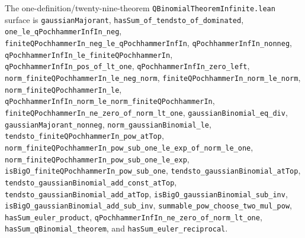 \documentclass[11pt,oneside]{article}
\theoremstyle{definition}
\theoremstyle{remark}
\begin{document}
The one-definition/twenty-nine-theorem
\nolinkurl{QBinomialTheoremInfinite.lean} surface is
\nolinkurl{gaussianMajorant},
\nolinkurl{hasSum_of_tendsto_of_dominated},
\nolinkurl{one_le_qPochhammerInfIn_neg},
\nolinkurl{finiteQPochhammerIn_neg_le_qPochhammerInfIn},
\nolinkurl{qPochhammerInfIn_nonneg},
\nolinkurl{qPochhammerInfIn_le_finiteQPochhammerIn},
\nolinkurl{qPochhammerInfIn_pos_of_lt_one},
\nolinkurl{qPochhammerInfIn_zero_left},
\nolinkurl{norm_finiteQPochhammerIn_le_neg_norm},
\nolinkurl{finiteQPochhammerIn_norm_le_norm},
\nolinkurl{norm_finiteQPochhammerIn_le},
\nolinkurl{qPochhammerInfIn_norm_le_norm_finiteQPochhammerIn},
\nolinkurl{finiteQPochhammerIn_ne_zero_of_norm_lt_one},
\nolinkurl{gaussianBinomial_eq_div},
\nolinkurl{gaussianMajorant_nonneg},
\nolinkurl{norm_gaussianBinomial_le},
\nolinkurl{tendsto_finiteQPochhammerIn_pow_atTop},
\nolinkurl{norm_finiteQPochhammerIn_pow_sub_one_le_exp_of_norm_le_one},
\nolinkurl{norm_finiteQPochhammerIn_pow_sub_one_le_exp},
\nolinkurl{isBigO_finiteQPochhammerIn_pow_sub_one},
\nolinkurl{tendsto_gaussianBinomial_atTop},
\nolinkurl{tendsto_gaussianBinomial_add_const_atTop},
\nolinkurl{tendsto_gaussianBinomial_add_atTop},
\nolinkurl{isBigO_gaussianBinomial_sub_inv},
\nolinkurl{isBigO_gaussianBinomial_add_sub_inv},
\nolinkurl{summable_pow_choose_two_mul_pow},
\nolinkurl{hasSum_euler_product},
\nolinkurl{qPochhammerInfIn_ne_zero_of_norm_lt_one},
\nolinkurl{hasSum_qBinomial_theorem}, and
\nolinkurl{hasSum_euler_reciprocal}.
\end{document}
